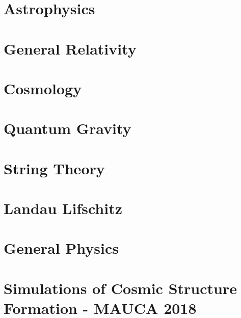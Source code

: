 \documentclass[10pt,a4paper]{book}
\theoremstyle{definition}
\begin{document}
\chapter{Astrophysics}


\chapter{General Relativity}


\chapter{Cosmology}


\chapter{Quantum Gravity}


\chapter{String Theory}


\chapter{Landau Lifschitz}


\chapter{General Physics}



\newpage
\chapter{Simulations of Cosmic Structure Formation - MAUCA 2018}
\end{document}
